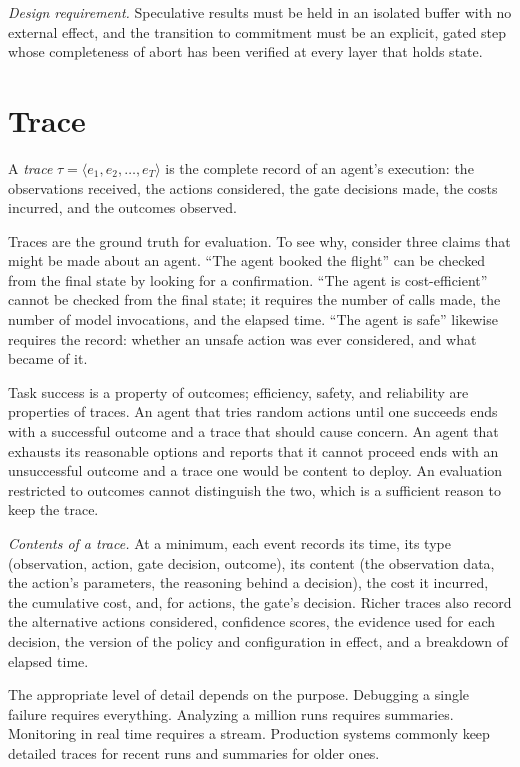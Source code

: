 \documentclass[11pt]{book}
\begin{document}
\textit{Design requirement.} Speculative results must be held in an isolated buffer with no external effect, and the transition to commitment must be an explicit, gated step whose completeness of abort has been verified at every layer that holds state.

\section{Trace}

A \emph{trace} $\tau = \langle e_1, e_2, \ldots, e_T \rangle$ is the complete record of an agent's execution: the observations received, the actions considered, the gate decisions made, the costs incurred, and the outcomes observed.

Traces are the ground truth for evaluation. To see why, consider three claims that might be made about an agent. ``The agent booked the flight'' can be checked from the final state by looking for a confirmation. ``The agent is cost-efficient'' cannot be checked from the final state; it requires the number of calls made, the number of model invocations, and the elapsed time. ``The agent is safe'' likewise requires the record: whether an unsafe action was ever considered, and what became of it.

Task success is a property of outcomes; efficiency, safety, and reliability are properties of traces. An agent that tries random actions until one succeeds ends with a successful outcome and a trace that should cause concern. An agent that exhausts its reasonable options and reports that it cannot proceed ends with an unsuccessful outcome and a trace one would be content to deploy. An evaluation restricted to outcomes cannot distinguish the two, which is a sufficient reason to keep the trace.

\textit{Contents of a trace.} At a minimum, each event records its time, its type (observation, action, gate decision, outcome), its content (the observation data, the action's parameters, the reasoning behind a decision), the cost it incurred, the cumulative cost, and, for actions, the gate's decision. Richer traces also record the alternative actions considered, confidence scores, the evidence used for each decision, the version of the policy and configuration in effect, and a breakdown of elapsed time.

The appropriate level of detail depends on the purpose. Debugging a single failure requires everything. Analyzing a million runs requires summaries. Monitoring in real time requires a stream. Production systems commonly keep detailed traces for recent runs and summaries for older ones.
\end{document}
